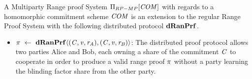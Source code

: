 \begin{definition}\label{def:pre:mp-rangeproof}
    A Multiparty Range proof System $\Pi_{RP-MP}[\mathit{COM}]$ with regards to a homomorphic commitment scheme $\mathit{COM}$ is an extension to the regular Range Proof System with the following
    distributed protocol $\mathbf{dRanPrf}$.
    \begin{itemize}
        \item $\pi ~\leftarrow~ \mathbf{dRanPrf} \langle(\mathit{C},\mathit{v},\mathit{r}_{\mathit{A}}),(\mathit{C},\mathit{v},\mathit{r}_{\mathit{B}})\rangle$: The distributed proof protocol allows two parties Alice and Bob, each owning a share of the
        commitment $\mathit{C}$ to cooperate in order to produce a valid range proof $\pi$ without a party learning the blinding factor share from the other party.
    \end{itemize}
\end{definition}